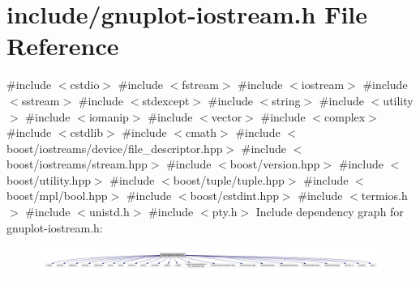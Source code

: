 \hypertarget{gnuplot-iostream_8h}{}\section{include/gnuplot-\/iostream.h File Reference}
\label{gnuplot-iostream_8h}
{\ttfamily \#include $<$cstdio$>$}\newline
{\ttfamily \#include $<$fstream$>$}\newline
{\ttfamily \#include $<$iostream$>$}\newline
{\ttfamily \#include $<$sstream$>$}\newline
{\ttfamily \#include $<$stdexcept$>$}\newline
{\ttfamily \#include $<$string$>$}\newline
{\ttfamily \#include $<$utility$>$}\newline
{\ttfamily \#include $<$iomanip$>$}\newline
{\ttfamily \#include $<$vector$>$}\newline
{\ttfamily \#include $<$complex$>$}\newline
{\ttfamily \#include $<$cstdlib$>$}\newline
{\ttfamily \#include $<$cmath$>$}\newline
{\ttfamily \#include $<$boost/iostreams/device/file\+\_\+descriptor.\+hpp$>$}\newline
{\ttfamily \#include $<$boost/iostreams/stream.\+hpp$>$}\newline
{\ttfamily \#include $<$boost/version.\+hpp$>$}\newline
{\ttfamily \#include $<$boost/utility.\+hpp$>$}\newline
{\ttfamily \#include $<$boost/tuple/tuple.\+hpp$>$}\newline
{\ttfamily \#include $<$boost/mpl/bool.\+hpp$>$}\newline
{\ttfamily \#include $<$boost/cstdint.\+hpp$>$}\newline
{\ttfamily \#include $<$termios.\+h$>$}\newline
{\ttfamily \#include $<$unistd.\+h$>$}\newline
{\ttfamily \#include $<$pty.\+h$>$}\newline
Include dependency graph for gnuplot-\/iostream.h\+:\nopagebreak
\begin{figure}[H]
\begin{center}
\leavevmode
\includegraphics[width=350pt]{gnuplot-iostream_8h__incl}
\end{center}
\end{figure}
